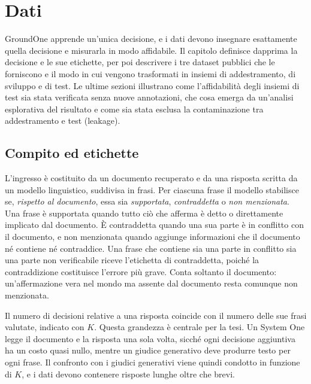 \chapter{Dati}
\label{ch:data}

GroundOne apprende un'unica decisione, e i dati devono insegnare esattamente quella decisione e misurarla in modo
affidabile. Il capitolo definisce dapprima la decisione e le sue etichette, per poi descrivere i tre dataset pubblici
che le forniscono e il modo in cui vengono trasformati in insiemi di addestramento, di sviluppo e di test. Le ultime
sezioni illustrano come l'affidabilità degli insiemi di test sia stata verificata senza nuove annotazioni, che cosa
emerga da un'analisi esplorativa del risultato e come sia stata esclusa la contaminazione tra addestramento e test
(leakage).


\section{Compito ed etichette}
\label{sec:data-task}

L'ingresso è costituito da un documento recuperato e da una risposta scritta da un modello linguistico, suddivisa in
frasi. Per ciascuna frase il modello stabilisce se, \emph{rispetto al documento}, essa sia \emph{supportata},
\emph{contraddetta} o \emph{non menzionata}. Una frase è supportata quando tutto ciò che afferma è detto o direttamente
implicato dal documento. È contraddetta quando una sua parte è in conflitto con il documento, e non menzionata quando
aggiunge informazioni che il documento né contiene né contraddice. Una frase che contiene sia una parte in conflitto sia
una parte non verificabile riceve l'etichetta di contraddetta, poiché la contraddizione costituisce l'errore più grave.
Conta soltanto il documento: un'affermazione vera nel mondo ma assente dal documento resta comunque non menzionata.

Il numero di decisioni relative a una risposta coincide con il numero delle sue frasi valutate, indicato con $K$. Questa
grandezza è centrale per la tesi. Un System One legge il documento e la risposta una sola volta, sicché ogni decisione
aggiuntiva ha un costo quasi nullo, mentre un giudice generativo deve produrre testo per ogni frase. Il confronto con i
giudici generativi viene quindi condotto in funzione di $K$, e i dati devono contenere risposte lunghe oltre che brevi.

